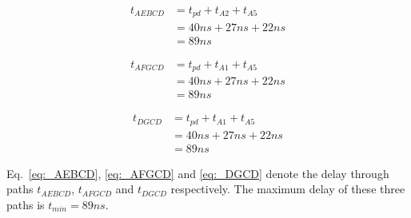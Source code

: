 \begin{equation}\label{eq:_AEBCD}
    \begin{split}
    t_{AEBCD} &= t_{pd} + t_{A2} + t_{A5}\\
     &= 40ns + 27ns + 22ns\\
     &= 89ns
    \end{split}
\end{equation}

\begin{equation}\label{eq:_AFGCD}
    \begin{split}
    t_{AFGCD} &= t_{pd} + t_{A1} + t_{A5}\\
     &= 40ns + 27ns + 22ns\\
     &= 89ns
    \end{split}
\end{equation}

\begin{equation}\label{eq:_DGCD}
    \begin{split}
    t_{DGCD} &= t_{pd} + t_{A1} + t_{A5}\\
        &= 40ns + 27ns + 22ns\\
        &= 89ns
    \end{split}
\end{equation}

Eq.~\ref{eq:_AEBCD}, \ref{eq:_AFGCD} and \ref{eq:_DGCD} denote the delay through paths $t_{AEBCD}$, $t_{AFGCD}$ and $t_{DGCD}$ respectively. The maximum delay of these three paths is $t_{min} = 89ns$.


